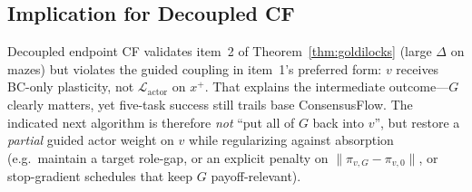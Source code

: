 \subsection{Implication for Decoupled CF}
\label{subsec:vg-implication}

Decoupled endpoint CF validates item~2 of Theorem~\ref{thm:goldilocks}
(large $\Delta$ on mazes) but violates the guided coupling in
item~1's preferred form: $v$ receives BC-only plasticity, not
$\mathcal{L}_{\mathrm{actor}}$ on $x^+$.
That explains the intermediate outcome---$G$ clearly matters, yet five-task
success still trails base ConsensusFlow.
The indicated next algorithm is therefore \emph{not} ``put all of $G$ back into
$v$'', but restore a \emph{partial} guided actor weight on $v$ while
regularizing against absorption (e.g.\ maintain a target role-gap, or an
explicit penalty on $\|\pi_{v,G}-\pi_{v,0}\|$, or stop-gradient schedules that
keep $G$ payoff-relevant).
